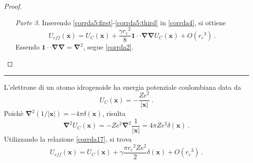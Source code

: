 \documentclass[12pt,a4paper]{report}
\numberwithin{equation}{section}
\numberwithin{section}{chapter}
\begin{document}
\begin{proof}
\begin{enumerate} [leftmargin=0pt, itemindent=2.67\parindent]
\begin{equation}
		\end{equation}
		La distribuzione \`e necessariamente normalizzata, per cui
		\begin{equation}
		\label{corrda13}
		\langle 1\rangle = \oint d^2n\int_{0}^{\infty}d\xi~\xi^2r(|\boldsymbol{\xi}|) = 1~,
		\end{equation}
		che implica \eqref{corrda5:first}. Da \eqref{corrda8}, si ottiene
		\begin{equation}
		\label{corrda14}
		\langle\boldsymbol{\xi}\rangle = \oint d^2n~\boldsymbol{n}\int_{0}^{\infty}d\xi~\xi^3r(|\boldsymbol{\xi}|) = \boldsymbol{0}~,
		\end{equation}
		dimostrando \eqref{corrda5:second}. Si pu\`o pensare a quest'ultimo risultato come l'annullamento a due a due delle deviazioni per ogni direzione. Infine, da \eqref{corrda11}, si ricava
		\begin{equation}
		\label{corrda15}
		\langle\boldsymbol{\xi\xi}\rangle = \oint d^2n~\boldsymbol{nn}\int_{0}^{\infty}d\xi~\xi^4r(|\boldsymbol{\xi}|) = \frac{\gamma {r_c}^2}{4}\boldsymbol{1}~,
		\end{equation}
		dove $\gamma$ \`e la costante adimensionale
		\begin{equation}
		\label{corrda16}
		\gamma = \frac{16\pi}{3{r_c}^2}\int_{0}^{\infty}d\xi~\xi^4r(|\boldsymbol{\xi}|)~,
		\end{equation}	
		che dimostra \eqref{corrda5:third}.
		\item [\textit{Parte 3.}] Inserendo \eqref{corrda5:first}-\eqref{corrda5:third} in \eqref{corrda4}, si ottiene
		\begin{equation}
		\label{corrda17}
		U_{eff}(\boldsymbol{x}) = U_C(\boldsymbol{x}) + \frac{\gamma {r_c}^2}{8}\boldsymbol{1} \cdot \cdot \boldsymbol{\nabla\nabla}U_C(\boldsymbol{x}) + O({r_c}^3)~.
		\end{equation}	
		Essendo $\boldsymbol{1}\cdot\cdot\boldsymbol{\nabla\nabla} = \boldsymbol{\nabla}^2$, segue \eqref{corrda2}.
		\end{enumerate}
	\end{proof}
	\noindent\rule[0.1cm]{15.8cm}{0.1mm}\par
	L'elettrone di un atomo idrogenoide ha energia potenziale coulombiana data da 
	\begin{equation}
	\label{corrda18}
	U_C(\boldsymbol{x}) = -\frac{Ze^2}{|\boldsymbol{x}|}~.
	\end{equation}
	Poich\`e $\boldsymbol{\nabla}^2(1/|\boldsymbol{x}|) = - 4\pi \delta(\boldsymbol{x})$, risulta
	\begin{equation}
	\label{corrda19}
	\boldsymbol{\nabla}^2U_C(\boldsymbol{x}) = -Ze^2\boldsymbol{\nabla}^2\frac{1}{|\boldsymbol{x}|} = 4\pi Ze^2\delta(\boldsymbol{x})~.
	\end{equation}
	Utilizzando la relazione \eqref{corrda17}, si trova
	\begin{equation}
	\label{corrda20}
	U_{eff}(\boldsymbol{x}) = U_C(\boldsymbol{x}) + \gamma\frac{\pi {r_c}^2Ze^2}{2}\delta(\boldsymbol{x}) + O({r_c}^3)~.
	\end{equation}
	
\end{document}
